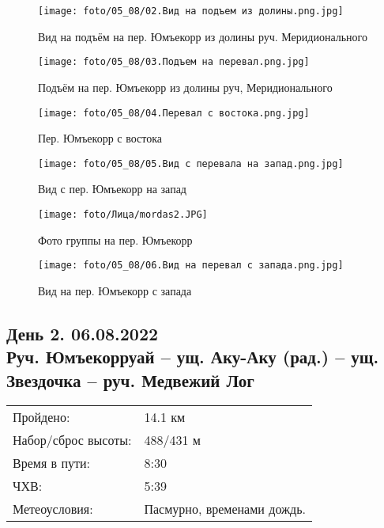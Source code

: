 \begin{figure}
    \centering
    \texttt{[image: foto/05\_08/02.Вид на подъем из долины.png.jpg]}
    \caption{Вид на подъём на пер. Юмъекорр из долины руч. Меридионального}
    \label{fig1:3}
\end{figure}

\begin{figure}
    \centering
    \texttt{[image: foto/05\_08/03.Подъем на перевал.png.jpg]}
    \caption{Подъём на пер. Юмъекорр из долины руч, Меридионального}
    \label{fig1:4}
\end{figure}

\begin{figure}
    \centering
    \texttt{[image: foto/05\_08/04.Перевал с востока.png.jpg]}
    \caption{Пер. Юмъекорр с востока}
    \label{fig1:5}
\end{figure}

\begin{figure}
    \centering
    \texttt{[image: foto/05\_08/05.Вид с перевала на запад.png.jpg]}
    \caption{Вид с пер. Юмъекорр на запад}
    \label{fig1:6}
\end{figure}

\begin{figure}
    \centering
    \texttt{[image: foto/Лица/mordas2.JPG]}
    \caption{Фото группы на пер. Юмъекорр}
    \label{fig1:7}
\end{figure}

\begin{figure}
    \centering
    \texttt{[image: foto/05\_08/06.Вид на перевал с запада.png.jpg]}
    \caption{Вид на пер. Юмъекорр с запада}
    \label{fig1:8}
\end{figure}

\FloatBarrier

\subsection{День 2. 06.08.2022\\
Руч. Юмъекорруай -- ущ. Аку-Аку (рад.) -- ущ. Звездочка -- руч. Медвежий Лог}
\begin{tabular}{l p{12cm}}
\hline
Пройдено: & 14.1 км\\
Набор/сброс высоты: & 488/431 м\\
Время в пути: & 8:30\\
ЧХВ: & 5:39\\
Метеоусловия: & Пасмурно, временами дождь.\\
\hline
\end{tabular}

